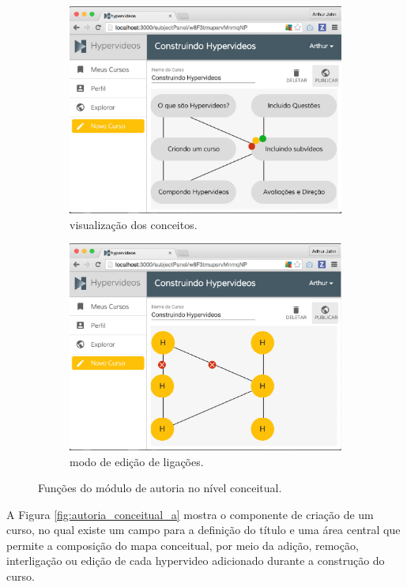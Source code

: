 \begin{figure}[h!]
	\begin{subfigure}{.5\textwidth}
  		\centering
  		\includegraphics[width=.9\linewidth]{figuras/autoria_conceitual_c.eps}
  		\caption{visualização dos conceitos.}
  		\label{fig:autoria_conceitual_c}
	\end{subfigure}%
	\begin{subfigure}{.5\textwidth}
  		\centering
  		\includegraphics[width=.9\linewidth]{figuras/autoria_conceitual_d.eps}
  		\caption{modo de edição de ligações.}
  		\label{fig:autoria_conceitual_d}
	\end{subfigure}%
  	\caption{Funções do módulo de autoria no nível conceitual.}
  	\label{fig:autoria_conceitual}
\end{figure}

A Figura \ref{fig:autoria_conceitual_a} mostra o componente de criação de um curso, no qual existe um campo para a definição do título e uma área central que permite a composição do mapa conceitual, por meio da adição, remoção, interligação ou edição de cada hypervideo adicionado durante a construção do curso.

